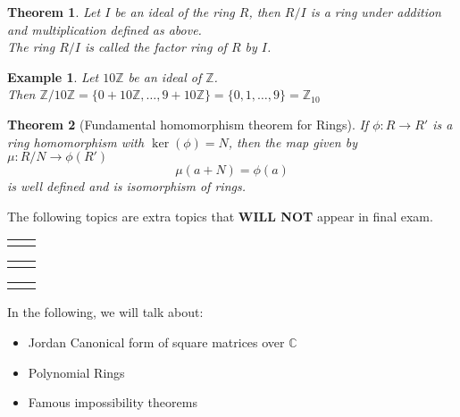\documentclass{article}
\theoremstyle{MyNonumberplain}
\theoremstyle{break}
\newcommand{\nline}{\begin{tabular}{ll}&\\\end{tabular}}
\theoremstyle{break}
\newtheorem{theorem}{Theorem}[section]
\newtheorem{example}{Example}[section]
\theoremstyle{break}
\theoremstyle{definition}
\theoremstyle{break}
\begin{document}
\begin{thmbox}
    \begin{theorem}
        Let $I$ be an ideal of the ring $R$, then $R / I$ is a ring under addition and
        multiplication defined as above.\\
        
        The ring $R / I$ is called the factor ring of $R$ by $I$. 
    \end{theorem}

\end{thmbox}


\begin{expbox}
    \begin{example}
        Let $10\mathbb{Z}$ be an ideal of $\mathbb{Z}$.\\

        Then $\mathbb{Z}/ 10\mathbb{Z}= \{ 0 + 10\mathbb{Z}, \ldots, 9 + 10\mathbb{Z}
        \} = \{ 0, 1, \ldots, 9 \} =\mathbb{Z}_{10}$
    \end{example}
\end{expbox}

\begin{thmbox}
    \begin{theorem}[Fundamental homomorphism theorem for Rings]
        If $\phi : R \rightarrow R'$ is a ring homomorphism with $\ker (\phi) = N$,
        then the map given by $\mu : R / N \rightarrow \phi (R')$
        \[ \mu (a + N) = \phi (a) \]
        is well defined and is isomorphism of rings. 
    \end{theorem}
\end{thmbox}

\newpage


\begin{center}
    \vspace*{\fill}
        The following topics are extra topics that \textbf{WILL NOT} appear in final exam.

        \nline
        \nline
        \nline

        In the following, we will talk about:
        \begin{itemize}
        \item Jordan Canonical form of square matrices over $\mathbb{C}$

        \item Polynomial Rings

        \item Famous impossibility theorems
        \end{itemize}
    \vspace*{\fill}
\end{center}
\end{document}
